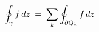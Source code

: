 \documentclass[preview]{standalone}
\begin{document}
\begin{align*}
\special{dvisvgm:raw <g id='unique000'>}\oint_{\gamma} f\,dz \;=\; \sum_{k} \oint_{\partial Q_k} f\,dz\special{dvisvgm:raw </g>}
\end{align*}
\end{document}
